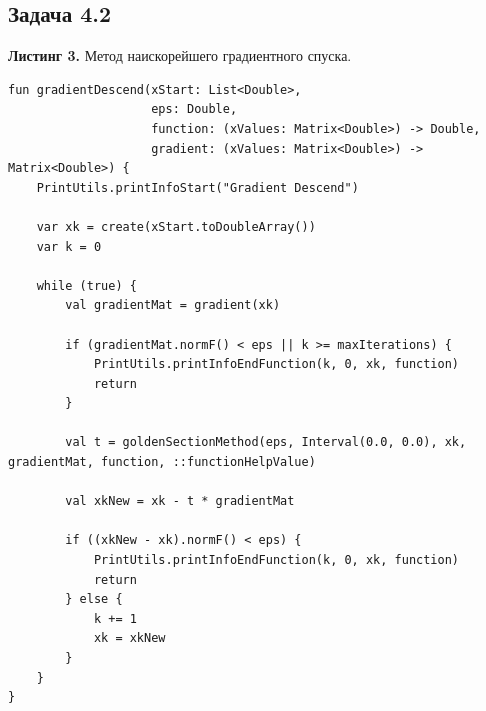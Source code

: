 \documentclass[a4paper, 12pt]{article}   	%
\begin{document}
\subsection{Задача 4.2}
    \textbf{Листинг 3.} Метод наискорейшего градиентного спуска.
    \begin{verbatim}
fun gradientDescend(xStart: List<Double>,
                    eps: Double,
                    function: (xValues: Matrix<Double>) -> Double,
                    gradient: (xValues: Matrix<Double>) -> Matrix<Double>) {
    PrintUtils.printInfoStart("Gradient Descend")

    var xk = create(xStart.toDoubleArray())
    var k = 0

    while (true) {
        val gradientMat = gradient(xk)

        if (gradientMat.normF() < eps || k >= maxIterations) {
            PrintUtils.printInfoEndFunction(k, 0, xk, function)
            return
        }

        val t = goldenSectionMethod(eps, Interval(0.0, 0.0), xk, gradientMat, function, ::functionHelpValue)

        val xkNew = xk - t * gradientMat

        if ((xkNew - xk).normF() < eps) {
            PrintUtils.printInfoEndFunction(k, 0, xk, function)
            return
        } else {
            k += 1
            xk = xkNew
        }
    }
}
\end{verbatim}
\end{document}

